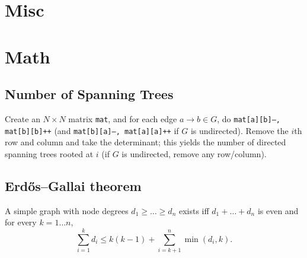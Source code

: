 \section{Misc}

\section{Math}
	\subsection{Number of Spanning Trees}
		Create an $N\times N$ matrix \texttt{mat}, and for each edge $a \rightarrow b \in G$, do
		\texttt{mat[a][b]--, mat[b][b]++} (and \texttt{mat[b][a]--, mat[a][a]++} if $G$ is undirected).
		Remove the $i$th row and column and take the determinant; this yields the number of directed spanning trees rooted at $i$
		(if $G$ is undirected, remove any row/column).

	\subsection{Erdős–Gallai theorem}
		A simple graph with node degrees $d_1 \ge \dots \ge d_n$ exists iff $d_1 + \dots + d_n$ is even and for every $k = 1\dots n$,
		\[ \sum _{i=1}^{k}d_{i}\leq k(k-1)+\sum _{i=k+1}^{n}\min(d_{i},k). \]

